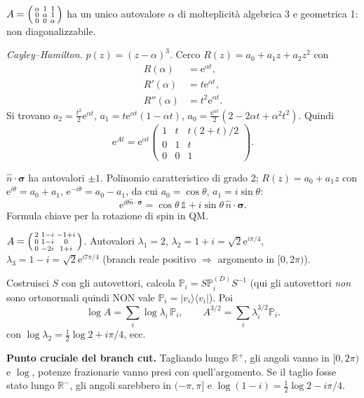 \documentclass[11pt,a4paper,openany]{book}
\theoremstyle{definition}
\newcommand{\R}{\mathbb{R}}
\newcommand{\ket}[1]{|#1\rangle}
\newcommand{\bra}[1]{\langle#1|}
\newcommand{\eu}{\mathrm{e}}
\begin{document}
\begin{esempio}
$A=\begin{psmallmatrix}\alpha&1&1\\0&\alpha&1\\0&0&\alpha\end{psmallmatrix}$ ha un unico autovalore $\alpha$ di molteplicit\`a algebrica 3 e geometrica 1: non diagonalizzabile.

\emph{Cayley--Hamilton.} $p(z)=(z-\alpha)^3$. Cerco $R(z)=a_0+a_1 z+a_2 z^2$ con
\begin{align*}
R(\alpha)&=\eu^{\alpha t},\\
R'(\alpha)&=t\eu^{\alpha t},\\
R''(\alpha)&=t^2\eu^{\alpha t}.
\end{align*}
Si trovano $a_2=\tfrac{t^2}{2}\eu^{\alpha t}$, $a_1=t\eu^{\alpha t}(1-\alpha t)$, $a_0=\tfrac{\eu^{\alpha t}}{2}(2-2\alpha t+\alpha^2 t^2)$. Quindi
$$\eu^{At}=\eu^{\alpha t}\begin{pmatrix}1 & t & t(2+t)/2\\ 0 & 1 & t\\ 0 & 0 & 1\end{pmatrix}.$$
\end{esempio}

\begin{esempio}[Set 1, Es. 11 -- $\eu^{i\theta\hat n\cdot\bm\sigma}$]
$\hat n\cdot\bm\sigma$ ha autovalori $\pm 1$. Polinomio caratteristico di grado 2; $R(z)=a_0+a_1 z$ con
$\eu^{i\theta}=a_0+a_1$, $\eu^{-i\theta}=a_0-a_1$, da cui $a_0=\cos\theta$, $a_1=i\sin\theta$:
$$\eu^{i\theta\hat n\cdot\bm\sigma}=\cos\theta\,\mathbb 1+i\sin\theta\,\hat n\cdot\bm\sigma.$$
Formula chiave per la rotazione di spin in QM.
\end{esempio}

\begin{esempio}
$A=\begin{psmallmatrix}2 & 1-i & -1+i\\ 0 & 1-i & 0\\ 0 & -2i & 1+i\end{psmallmatrix}$. Autovalori $\lambda_1=2$, $\lambda_2=1+i=\sqrt 2\eu^{i\pi/4}$, $\lambda_3=1-i=\sqrt 2\eu^{i7\pi/4}$ (branch reale positivo $\Rightarrow$ argomento in $[0,2\pi)$).

Costruisci $S$ con gli autovettori, calcola $\mathbb P_i=S\mathbb P^{(D)}_i S^{-1}$ (qui gli autovettori \emph{non} sono ortonormali quindi NON vale $\mathbb P_i=\ket{v_i}\bra{v_i}$). Poi
$$\log A=\sum_i\log\lambda_i\,\mathbb P_i,\qquad A^{3/2}=\sum_i\lambda_i^{3/2}\mathbb P_i.$$
con $\log\lambda_2=\tfrac{1}{2}\log 2+i\pi/4$, ecc.

\textbf{Punto cruciale del branch cut.} Tagliando lungo $\R^+$, gli angoli vanno in $[0,2\pi)$ e $\log$, potenze frazionarie vanno presi con quell'argomento. Se il taglio fosse stato lungo $\R^-$, gli angoli sarebbero in $(-\pi,\pi]$ e $\log(1-i)=\tfrac 1 2\log 2-i\pi/4$.
\end{esempio}
\end{document}
